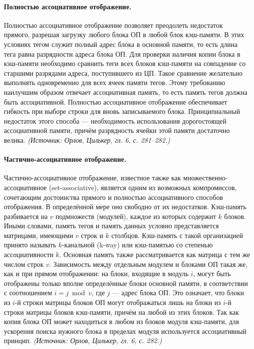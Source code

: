 \documentclass[a4paper,12pt]{article}
\begin{document}
\paragraph{Полностью ассоциативное отображение.}
Полностью ассоциативное отображение позволяет преодолеть недостаток прямого, разрешая загрузку любого блока ОП в любой блок кэш-памяти. В этих условиях тегом служит полный адрес блока в основной памяти, то есть длина тега равна разрядности адреса блока ОП. Для проверки наличия копии блока в кэш-памяти необходимо сравнить теги всех блоков кэш-памяти на совпадение со старшими разрядами адреса, поступившего из ЦП. Такое сравнение желательно выполнять одновременно для всех ячеек памяти тегов. Этому требованию наилучшим образом отвечает ассоциативная память, то есть память тегов должна быть ассоциативной. Полностью ассоциативное отображение обеспечивает гибкость при выборе строки для вновь записываемого блока. Принципиальный недостаток этого способа --- необходимость использования дорогостоящей ассоциативной памяти, причём разрядность ячейки этой памяти достаточно велика.
\textit{(Источник: Орлов, Цилькер, гл. 6, с. 281--282.)}

\paragraph{Частично-ассоциативное отображение.}
Частично-ассоциативное отображение, известное также как множественно-ассоциативное (set-associative), является одним из возможных компромиссов, сочетающим достоинства прямого и полностью ассоциативного способов отображения. В определённой мере оно свободно от их недостатков. Кэш-память разбивается на \(v\) подмножеств (модулей), каждое из которых содержит \(k\) блоков. Иными словами, память тегов и память данных условно представляется матрицами, имеющими \(v\) строк и \(k\) столбцов. Кэш-память с такой организацией принято называть \(k\)-канальной (k-way) или кэш-памятью со степенью ассоциативности \(k\). Основная память также рассматривается как матрица с тем же числом строк \(v\). Зависимость между отдельным модулем и блоками ОП такая же, как и при прямом отображении: на блоки, входящие в модуль \(i\), могут быть отображены только вполне определённые блоки основной памяти, в соответствии с соотношением \(i=j\bmod v\), где \(j\) --- адрес блока ОП. Это означает, что блоки из \(i\)-й строки матрицы блоков ОП могут отображаться лишь на блоки из \(i\)-й строки матрицы блоков кэш-памяти, причём на любой из этих блоков. Так как копия блока ОП может находиться в любом из блоков модуля кэш-памяти, для ускорения поиска нужного блока в пределах модуля используется ассоциативный принцип.
\textit{(Источник: Орлов, Цилькер, гл. 6, с. 282.)}
\end{document}
